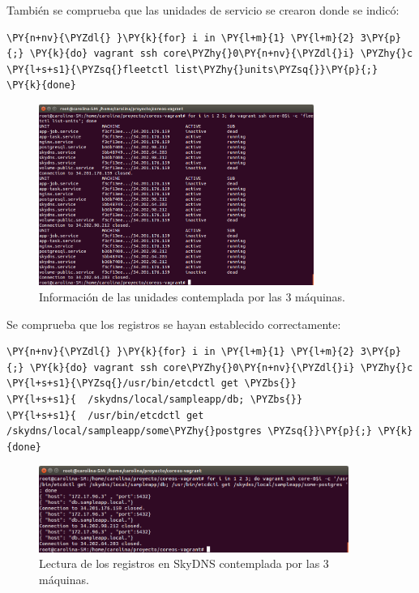 También se comprueba que las unidades de servicio se crearon donde se indicó:
\begin{framed_shaded}
\begin{Verbatim}[fontsize=\relsize{-2.5},fontseries=b,commandchars=\\\{\}]
\PY{n+nv}{\PYZdl{} }\PY{k}{for} i in \PY{l+m}{1} \PY{l+m}{2} 3\PY{p}{;} \PY{k}{do} vagrant ssh core\PYZhy{}0\PY{n+nv}{\PYZdl{}i} \PYZhy{}c \PY{l+s+s1}{\PYZsq{}fleetctl list\PYZhy{}units\PYZsq{}}\PY{p}{;} \PY{k}{done}
\end{Verbatim}
\end{framed_shaded}

\begin{figure}[H]
\centering
\includegraphics[width=0.8\textwidth]{images/figures/skydns-units.png}
\caption{Información de las unidades contemplada por las 3 máquinas.}
\end{figure}

Se comprueba que los registros se hayan establecido correctamente:

\begin{framed_shaded}
\begin{Verbatim}[fontsize=\relsize{-2.5},fontseries=b,commandchars=\\\{\}]
\PY{n+nv}{\PYZdl{} }\PY{k}{for} i in \PY{l+m}{1} \PY{l+m}{2} 3\PY{p}{;} \PY{k}{do} vagrant ssh core\PYZhy{}0\PY{n+nv}{\PYZdl{}i} \PYZhy{}c \PY{l+s+s1}{\PYZsq{}/usr/bin/etcdctl get \PYZbs{}}
\PY{l+s+s1}{  /skydns/local/sampleapp/db; \PYZbs{}}
\PY{l+s+s1}{  /usr/bin/etcdctl get /skydns/local/sampleapp/some\PYZhy{}postgres \PYZsq{}}\PY{p}{;} \PY{k}{done}
\end{Verbatim}
\end{framed_shaded}

\begin{figure}[H]
\centering
\includegraphics[width=0.9\textwidth]{images/figures/skydns-gets.png}
\caption{Lectura de los registros en SkyDNS contemplada por las 3 máquinas.}
\end{figure}

